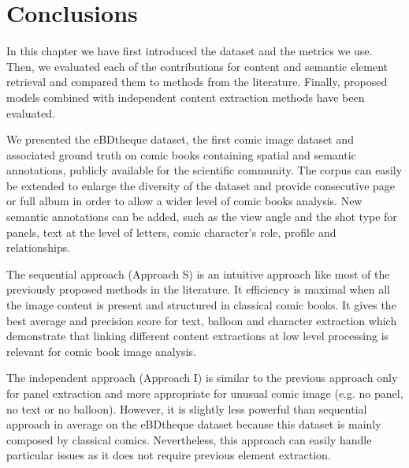 

\section{Conclusions}
\label{sub:ex:conclusion}

In this chapter we have first introduced the dataset and the metrics we use. Then, we evaluated each of the contributions for content and semantic element retrieval and compared them to methods from the literature.
Finally, proposed models combined with independent content extraction methods have been evaluated.

We presented the eBDtheque dataset, the first comic image dataset and associated ground truth on comic books containing spatial and semantic annotations, publicly available for the scientific community.
The corpus can easily be extended to enlarge the diversity of the dataset and provide consecutive page or full album in order to allow a wider level of comic books analysis.
New semantic annotations can be added, such as the view angle and the shot type for panels, text at the level of letters, comic character's role, profile and relationships. 

The sequential approach (Approach S) is an intuitive approach like most of the previously proposed methods in the literature.
It efficiency is maximal when all the image content is present and structured in classical comic books.
It gives the best average and precision score for text, balloon and character extraction which demonstrate that linking different content extractions at low level processing is relevant for comic book image analysis.

The independent approach (Approach I) is similar to the previous approach only for panel extraction and more appropriate for unusual comic image (e.g. no panel, no text or no balloon).
However, it is slightly less powerful than sequential approach in average on the eBDtheque dataset because this dataset is mainly composed by classical comics.
Nevertheless, this approach can easily handle particular issues as it does not require previous element extraction.

